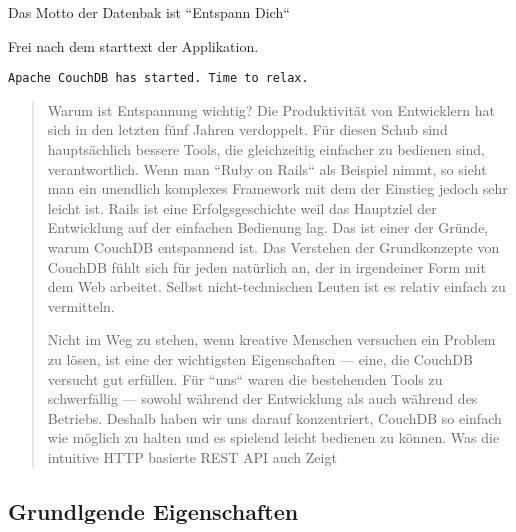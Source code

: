 Das Motto der Datenbak ist ``Entspann Dich``

Frei nach dem starttext der Applikation.

\begin{verbatim}
Apache CouchDB has started. Time to relax.
\end{verbatim}


\begin{quote}
Warum ist Entspannung wichtig? Die Produktivität von Entwicklern hat sich in den letzten fünf Jahren verdoppelt.
Für diesen Schub sind hauptsächlich bessere Tools, die gleichzeitig einfacher zu bedienen sind, verantwortlich.
Wenn man ``Ruby on Rails`` als Beispiel nimmt, so sieht man ein unendlich komplexes Framework mit dem der Einstieg jedoch sehr leicht ist.
Rails ist eine Erfolgsgeschichte weil das Hauptziel der Entwicklung auf der einfachen Bedienung lag.
Das ist einer der Gründe, warum CouchDB entspannend ist.
Das Verstehen der Grundkonzepte von CouchDB fühlt sich für jeden natürlich an, der in irgendeiner Form mit dem Web arbeitet.
Selbst nicht-technischen Leuten ist es relativ einfach zu vermitteln.

Nicht im Weg zu stehen, wenn kreative Menschen versuchen ein Problem zu lösen, ist eine der wichtigsten Eigenschaften — eine,
die CouchDB versucht gut erfüllen. Für ``uns`` waren die bestehenden Tools zu schwerfällig — sowohl während der Entwicklung
als auch während des Betriebs. Deshalb haben wir uns darauf konzentriert,
CouchDB so einfach wie möglich zu halten und es spielend leicht bedienen zu können.
Was die intuitive HTTP basierte REST API auch Zeigt
\end{quote}
\cite[Deutsche Einführung]{couchdb:guide}


\subsection{Grundlgende Eigenschaften}


